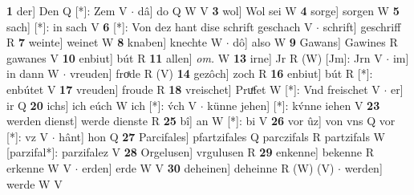 \documentclass[8pt,a4paper,notitlepage]{article}
\begin{document}
\begin{table}[ht]
\begin{minipage}[t]{0.5\linewidth}
\textbf{1} der] Den Q [*]: Zem V  $\cdot$ dâ] do Q W V \textbf{3} wol] Wol sei W \textbf{4} sorge] sorgen W \textbf{5} sach] [*]: in sach V \textbf{6} [*]: Von dez hant dise schrift geschach V  $\cdot$ schrift] geschriff R \textbf{7} weinte] weinet W \textbf{8} knaben] knechte W  $\cdot$ dô] also W \textbf{9} Gawans] Gawines R gawanes V \textbf{10} enbiut] bút R \textbf{11} allen] \textit{om.} W \textbf{13} irne] Jr R (W) [Jm]: Jrn  V  $\cdot$ im] in dann W  $\cdot$ vreuden] froͯde R (V) \textbf{14} gezôch] zoch R \textbf{16} enbiut] bút R [*]: enbútet V \textbf{17} vreuden] froude R \textbf{18} vreischet] Pruͤfet W [*]: Vnd freischet V  $\cdot$ er] ir Q \textbf{20} ichs] ich eúch W ich [*]: v́ch V  $\cdot$ künne jehen] [*]: kv́nne iehen V \textbf{23} werden dienst] werde dienste R \textbf{25} bî] an W [*]: bi V \textbf{26} vor ûz] von vns Q vor [*]: vz V  $\cdot$ hânt] hon Q \textbf{27} Parcifales] pfartzifales Q parczifals R partzifals W [parzifal*]: parzifalez V \textbf{28} Orgelusen] vrgulusen R \textbf{29} enkenne] bekenne R erkenne W V  $\cdot$ erden] erde W V \textbf{30} deheinen] deheinne R (W) (V)  $\cdot$ werden] werde W V \newline
\end{minipage}
\end{table}
\end{document}
